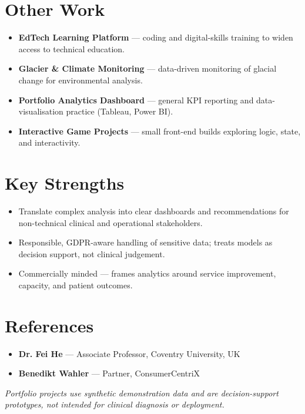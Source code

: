\documentclass[a4paper,10pt]{article}
\begin{document}
\section*{Other Work}
\begin{itemize}
  \item \textbf{EdTech Learning Platform} --- coding and digital-skills training to widen access to technical education.
  \item \textbf{Glacier \& Climate Monitoring} --- data-driven monitoring of glacial change for environmental analysis.
  \item \textbf{Portfolio Analytics Dashboard} --- general KPI reporting and data-visualisation practice (Tableau, Power BI).
  \item \textbf{Interactive Game Projects} --- small front-end builds exploring logic, state, and interactivity.
\end{itemize}

\section*{Key Strengths}
\begin{itemize}
  \item Translate complex analysis into clear dashboards and recommendations for non-technical clinical and operational stakeholders.
  \item Responsible, GDPR-aware handling of sensitive data; treats models as decision support, not clinical judgement.
  \item Commercially minded --- frames analytics around service improvement, capacity, and patient outcomes.
\end{itemize}

\section*{References}
\begin{itemize}
  \item \textbf{Dr. Fei He} --- Associate Professor, Coventry University, UK 
  \item \textbf{Benedikt Wahler} --- Partner, ConsumerCentriX 
\end{itemize}

\vfill
{\footnotesize\color{muted}\itshape Portfolio projects use synthetic demonstration data and are decision-support prototypes, not intended for clinical diagnosis or deployment.}
\end{document}

